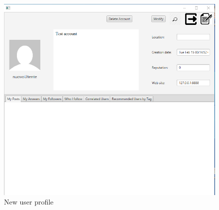 \documentclass[11pt]{report}
\begin{document}
\begin{figure}[H]
  \centering
  \includegraphics[width=\textwidth,keepaspectratio=true]{img/user_manual/RegistrazioneUtente2.png}
  \caption{New user profile}
  \label{fig:RegistrazioneUtente2}
\end{figure}
\end{document}
